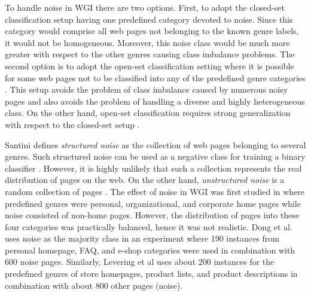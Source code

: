 To handle noise in WGI there are two options. First, to adopt the closed-set classification setup having one predefined category devoted to noise. Since this category would comprise all web pages not belonging to the known genre labels, it would not be homogeneous. Moreover, this noise class would be much more greater with respect to the other genres causing class imbalance problems. The second option is to adopt the open-set classification setting where it is possible for some web pages not to be classified into any of the predefined genre categories \parencite{pritsos2013open}. This setup avoids the problem of class imbalance caused by numerous noisy pages and also avoids the problem of handling a diverse and highly heterogeneous class. On the other hand, open-set classification requires strong generalization with respect to the closed-set setup \parencite{scheirer2013toward}.

Santini \parencite{santini2011cross} defines \textit{structured noise} as the collection of web pages belonging to  several genres. Such structured noise can be used as a negative class for training a binary classifier \parencite{Vidulin2007}. However, it is highly unlikely that such a collection  represents the real distribution of pages on the web. On the other hand, \textit{unstructured noise} is a random collection of pages \parencite{santini2011cross}. The effect of noise in WGI  was first studied in \parencite{shepherd2004cybergenre,kennedy2005automatic} where predefined genres were personal, organizational, and corporate home pages while noise consisted of non-home  pages. However, the distribution of pages into these four categories was practically balanced, hence it was not realistic. Dong et al.\parencite{dong2006binary} uses noise as the majority  class in an experiment where 190 instances from personal homepage, FAQ, and e-shop categories were used in combination with 600 noise pages. Similarly, Levering et al \parencite{levering2008using} uses about 200 instances for the predefined genres of store homepages, product lists, and product descriptions in combination with about 800 other pages (noise).

